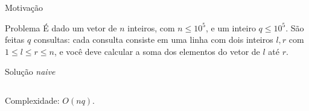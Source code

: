\begin{frame}{Motivação}

    \begin{block}{Problema}
        É dado um vetor de $n$ inteiros, com $n \leq 10^5$, e um inteiro $q \leq 10^5$. São feitas $q$ consultas: cada consulta consiste em uma linha com dois inteiros $l, r$ com $1 \leq l \leq r \leq n$, e você deve calcular a soma dos elementos do vetor de $l$ até $r$.
    \end{block} \pause

    \begin{block}{Solução \textit{naive}}
        \footnotesize
        \inputminted{cpp}{codigos/naive.cpp}    
    \end{block}

    Complexidade: \pause $O(nq)$.
\end{frame}

